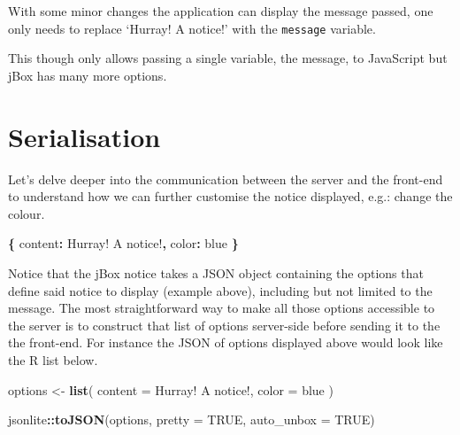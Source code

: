\documentclass[
]{krantz}
\makeatletter
\newenvironment{Shaded}{\begin{snugshade}}{\end{snugshade}}
\newcommand{\DataTypeTok}[1]{\textcolor[rgb]{0.27,0.27,0.27}{#1}}
\newcommand{\KeywordTok}[1]{\textcolor[rgb]{0.27,0.27,0.27}{\textbf{#1}}}
\newcommand{\NormalTok}[1]{#1}
\newcommand{\OperatorTok}[1]{\textcolor[rgb]{0.43,0.43,0.43}{\textbf{#1}}}
\newcommand{\OtherTok}[1]{\textcolor[rgb]{0.37,0.37,0.37}{#1}}
\newcommand{\StringTok}[1]{\textcolor[rgb]{0.5,0.5,0.5}{#1}}
\newenvironment{kframe}{%
\medskip{}
\setlength{\fboxsep}{.8em}
 \def\at@end@of@kframe{}%
 \ifinner\ifhmode%
  \def\at@end@of@kframe{\end{minipage}}%
  \begin{minipage}{\columnwidth}%
 \fi\fi%
 \def\FrameCommand##1{\hskip\@totalleftmargin \hskip-\fboxsep
 \colorbox{shadecolor}{##1}\hskip-\fboxsep
     \hskip-\linewidth \hskip-\@totalleftmargin \hskip\columnwidth}%
 \MakeFramed {\advance\hsize-\width
   \@totalleftmargin\z@ \linewidth\hsize
   \@setminipage}}%
 {\par\unskip\endMakeFramed%
 \at@end@of@kframe}
\renewenvironment{Shaded}{\begin{kframe}}{\end{kframe}}
\makeatother
\begin{document}
With some minor changes the application can display the message passed, one only needs to replace `Hurray! A notice!' with the \texttt{message} variable.

\begin{Shaded}
\end{Shaded}

This though only allows passing a single variable, the message, to JavaScript but jBox has many more options.

\hypertarget{serialisation}{%
\section{Serialisation}\label{serialisation}}

Let's delve deeper into the communication between the server and the front-end to understand how we can further customise the notice displayed, e.g.: change the colour.

\begin{Shaded}
\begin{Highlighting}[]
\OperatorTok{\{}
  \DataTypeTok{content}\OperatorTok{:} \StringTok{\textquotesingle{}Hurray! A notice!\textquotesingle{}}\OperatorTok{,}
  \DataTypeTok{color}\OperatorTok{:} \StringTok{\textquotesingle{}blue\textquotesingle{}}
\OperatorTok{\}}
\end{Highlighting}
\end{Shaded}

Notice that the jBox notice takes a JSON object containing the options that define said notice to display (example above), including but not limited to the message. The most straightforward way to make all those options accessible to the server is to construct that list of options server-side before sending it to the the front-end. For instance the JSON of options displayed above would look like the R list below.

\begin{Shaded}
\begin{Highlighting}[]
\NormalTok{options <{-}}\StringTok{ }\KeywordTok{list}\NormalTok{(}
  \DataTypeTok{content =} \StringTok{\textquotesingle{}Hurray! A notice!\textquotesingle{}}\NormalTok{,}
  \DataTypeTok{color =} \StringTok{\textquotesingle{}blue\textquotesingle{}}
\NormalTok{)}

\NormalTok{jsonlite}\OperatorTok{::}\KeywordTok{toJSON}\NormalTok{(options, }\DataTypeTok{pretty =} \OtherTok{TRUE}\NormalTok{, }\DataTypeTok{auto\_unbox =} \OtherTok{TRUE}\NormalTok{)}
\end{Highlighting}
\end{Shaded}
\end{document}
